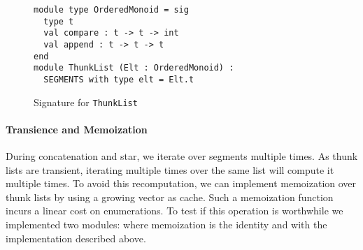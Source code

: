 
\begin{figure}[tp]
  \centering
\begin{lstlisting}
module type OrderedMonoid = sig
  type t
  val compare : t -> t -> int
  val append : t -> t -> t
end
module ThunkList (Elt : OrderedMonoid) :
  SEGMENTS with type elt = Elt.t
\end{lstlisting}
  \vspace{-\baselineskip}
  \caption{Signature for \texttt{ThunkList}}
  \label{code:thunklist}
\end{figure}

\paragraph{Transience and Memoization}

During concatenation and star, we iterate over segments multiple times.
As thunk lists are transient, iterating multiple times over the same list
will compute it multiple times. To avoid this recomputation, we can implement memoization
over thunk lists by using a growing vector as cache.
%
Such a memoization function incurs a linear cost on enumerations. To test
if this operation is worthwhile we implemented two modules:
 where memoization is the identity and 
with the implementation described above.


